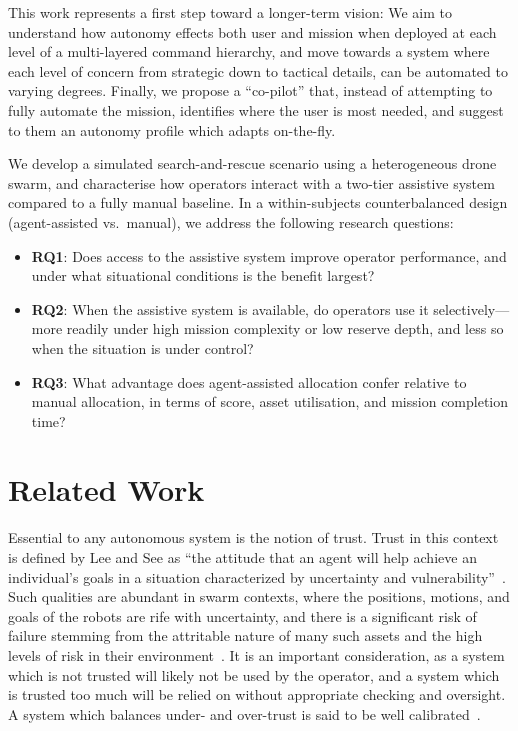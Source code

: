 \documentclass[10pt]{article}
\theoremstyle{definition}
\begin{document}
This work represents a first step toward a longer-term vision: We aim to understand how autonomy effects both user and mission when deployed at each level of a multi-layered command hierarchy, and move towards a system where each level of concern from strategic down to tactical details, can be automated to varying degrees. Finally, we propose a ``co-pilot'' that, instead of attempting to fully automate the mission, identifies where the user is most needed, and suggest to them an autonomy profile which adapts on-the-fly.

We develop a simulated search-and-rescue scenario using a heterogeneous drone swarm, and characterise how operators interact with a two-tier assistive system compared to a fully manual baseline. In a within-subjects counterbalanced design (agent-assisted vs.\ manual), we address the following research questions:
\begin{itemize}
  \item \textbf{RQ1}: Does access to the assistive system improve operator performance, and under what situational conditions is the benefit largest?
  \item \textbf{RQ2}: When the assistive system is available, do operators use it selectively---more readily under high mission complexity or low reserve depth, and less so when the situation is under control?
  \item \textbf{RQ3}: What advantage does agent-assisted allocation confer relative to manual allocation, in terms of score, asset utilisation, and mission completion time?
\end{itemize}

\section{Related Work}\label{sec:relatedwork}

Essential to any autonomous system is the notion of trust. Trust in this context is defined by Lee and See as ``the attitude that an agent will help achieve an individual's goals in a situation characterized by uncertainty and vulnerability''~\cite{lee2004trust}. Such qualities are abundant in swarm contexts, where the positions, motions, and goals of the robots are rife with uncertainty, and there is a significant risk of failure stemming from the attritable nature of many such assets and the high levels of risk in their environment~\cite{soorati2024enabling}. It is an important consideration, as a system which is not trusted will likely not be used by the operator, and a system which is trusted too much will be relied on without appropriate checking and oversight. A system which balances under- and over-trust is said to be well calibrated~\cite{mcdermott2019practical}.
\end{document}
